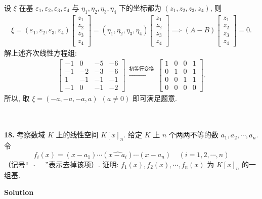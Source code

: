 \documentclass[11pt,a4paper,openany,oneside]{book}
\newcommand\Solution{\noindent\textbf{\textsf{Solution}}\par\medskip}
\begin{document}
设 $ \xi $ 在基 $ \varepsilon_1, \varepsilon_2, \varepsilon_3, \varepsilon_4 $ 与 $ \eta_1, \eta_2, \eta_3, \eta_4 $ 下的坐标都为 $ (z_1, z_2, z_3, z_4) $, 则
\begin{gather*}
\xi = (\varepsilon_1, \varepsilon_2, \varepsilon_3, \varepsilon_4)
\begin{bmatrix}
z_1 \\ z_2 \\ z_3 \\ z_4 
\end{bmatrix} = 
(\eta_1, \eta_2, \eta_3, \eta_4)
\begin{bmatrix}
z_1 \\ z_2 \\ z_3 \\ z_4 
\end{bmatrix} \implies
(A - B) 
\begin{bmatrix}
z_1 \\ z_2 \\ z_3 \\ z_4 
\end{bmatrix}
= 0.
\end{gather*}
解上述齐次线性方程组:
\begin{gather*}
\begin{bmatrix}
-1 & 0 & -5 & -6 \\
-1 & -2 & -3 & -6 \\
1 & -1 & -1 & -1 \\
-1 & 0 & -1 & -2 
\end{bmatrix} \ \xrightarrow{\text{初等行变换}} \ 
\begin{bmatrix}
1   &  0  &   0   &  1 \\
0   &  1   &  0  &   1  \\
0    & 0  &   1   &  1  \\
0     &0 &    0   &  0
\end{bmatrix}.
\end{gather*}
所以, 取 $ \xi = (-a, -a, -a, a) \ \ (a \neq 0)$ 即可满足题意.  \\  \\  \\




\begin{myexample}
	\textbf{18.} 
考察数域 $ K $ 上的线性空间 $ K[x]_n $. 给定 $ K $ 上 $ n $ 个两两不等的数 $ a_1, a_2, \cdots, a_n $. 令
 $$  f_i(x) = (x-a_1)\cdots(\widehat{x-a_i})\cdots(x-a_n) \ \ \ \ \ (i = 1, 2, \cdots, n)  $$ 
（记号“\ \  $ \widehat{} $ \ \ ”表示去掉该项）. 证明: $ f_1(x), f_2(x), \cdots, f_n(x) $ 为 $ K[x]_n $ 的一组基. 
\end{myexample}
\Solution 
\end{document}
